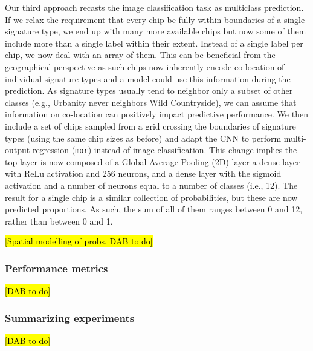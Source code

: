 Our third approach recasts the image classification task as multiclass
prediction. If we relax the requirement that every chip be fully within
boundaries of a single signature type, we end up with many more available
chips but now some of them include more than a single label within their
extent. Instead of a single label per chip, we now deal with an array of them.
This can be beneficial from the geographical perspective as such chips now inherently
encode co-location of individual signature types and a model could use this information
during the prediction. As signature types usually tend to neighbor only a subset of
other classes (e.g., Urbanity never neighbors Wild Countryside), we can assume that
information on co-location can positively impact predictive performance. We
then include a set of chips sampled from a grid crossing the boundaries of
signature types (using the same chip sizes as before) and adapt the CNN to
perform multi-output regression (\texttt{mor}) instead of image classification. This change
implies the top layer is now composed of a Global Average Pooling (2D) layer a
dense layer with ReLu
activation and 256 neurons, and a dense layer with the sigmoid activation and a number of
neurons equal to a number of classes (i.e., 12). The result for a single chip is a similar
collection of probabilities, but these are now predicted proportions. As such,
the sum of all of them ranges between 0 and 12, rather than between 0 and 1.


\hl{[Spatial modelling of probs. DAB to do]}

\subsubsection{Performance metrics}

\hl{[DAB to do]}




\subsubsection{Summarizing experiments}



\hl{[DAB to do]}

